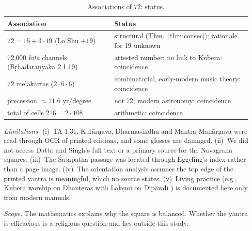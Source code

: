 \documentclass[pdflatex,sn-basic]{sn-jnl}
\theoremstyle{thmstyleone}
\theoremstyle{thmstylethree}
\begin{document}
\begin{table}[t]
\caption{Associations of 72: status.}
\label{tab:72}
\centering\footnotesize
\setlength{\tabcolsep}{2pt}
\begin{tabular}{@{}p{}p{}@{}}
\toprule
Association & Status\\
\midrule
$72=15+3\cdot19$ (Lo Shu $+19$) & structural (Thm.~\ref{thm:consec}); rationale for 19 unknown\\
72{,}000 \emph{hit\=a} channels (B\d rhad\=ara\d nyaka 2.1.19) \citep{gretil_bau} & attested number; no link to Kubera: coincidence\\
72 mela\-kartas ($2\cdot6\cdot6$) & combinatorial, early-modern music theory: coincidence\\
precession $\approx71.6$ yr/degree & not 72; modern astronomy: coincidence\\
total of cells $216=2\cdot108$ & arithmetic: coincidence\\
\bottomrule
\end{tabular}
\end{table}

\emph{Limitations.} (i)~TA 1.31, Kul\=ar\d nava, Dharmasindhu and Mantra Mah\=ar\d nava were read through OCR of printed editions, and some glosses are damaged. (ii)~We did not access Datta and Singh's full text \citep{datta1992} or a primary source for the Navagraha squares. (iii)~The \'Satapatha passage was located through Eggeling's index rather than a page image. (iv)~The orientation analysis assumes the top edge of the printed yantra is meaningful, which no source states. (v)~Living practice (e.g., Kubera worship on Dhanteras with Lak\d sm\=\i{} on D\=\i p\=aval\=\i{} \citep{drik_kubera_puja}) is documented here only from modern manuals.

\emph{Scope.} The mathematics explains why the square is balanced. Whether the yantra is efficacious is a religious question and lies outside this study.
\end{document}
